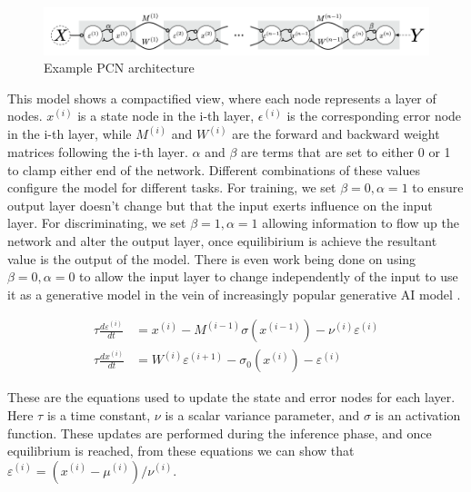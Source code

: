 \documentclass{article}
\theoremstyle{plain}
\theoremstyle{definition}
\theoremstyle{remark}
\begin{document}
\begin{figure}[ht]
\begin{center}
\centerline{\includegraphics[width=\columnwidth]{images/pc_arch.png}}
\caption{Example PCN architecture}
\end{center}
\end{figure}

This model shows a compactified view, where each node represents a layer
of nodes. \( x^{(i)}\) is a state node in the i-th layer, \( \epsilon^{(i)}\) is 
the corresponding error node in the i-th layer, while \(M^{(i)}\) and \(W^{(i)}\)
are the forward and backward weight matrices following the i-th layer. \(\alpha\) and \(\beta\)
are terms that are set to either 0 or 1 to clamp either end of the network. Different combinations 
of these values configure the model for different tasks. For training, we 
set \(\beta = 0, \alpha = 1\) to ensure output layer doesn't change but that 
the input exerts influence on the input layer. For discriminating, we set \(\beta = 1, \alpha = 1\)
allowing information to flow up the network and alter the output layer, once equilibirium 
is achieve the resultant value is the output of the model. There is even work 
being done on using \(\beta = 0, \alpha = 0\) to allow the input layer to change independently 
of the input to use it as a generative model in the vein of increasingly popular generative AI model 
\cite{orchard2019making}.

\begin{align}
    \tau \frac{d\varepsilon^{(i)}}{dt} &= x^{(i)} - M^{(i-1)}\sigma(x^{(i-1)}) - \nu^{(i)}\varepsilon^{(i)} \label{eq:1} \\
    \tau \frac{dx^{(i)}}{dt} &= W^{(i)}\varepsilon^{(i+1)} - \sigma_0(x^{(i)}) - \varepsilon^{(i)} \label{eq:2}
\end{align}

These are the equations used to update the state and error nodes for each layer.
Here \(\tau\) is a time constant, \(\nu\) is a scalar variance parameter, and \(\sigma\) is an
activation function. These updates are performed during the inference phase, and once equilibrium is reached, from 
these equations we can show that \(\varepsilon^{(i)} = (x^{(i)} - \mu^{(i)}) / \nu^{(i)} \label{eq:3}
\).
\end{document}
